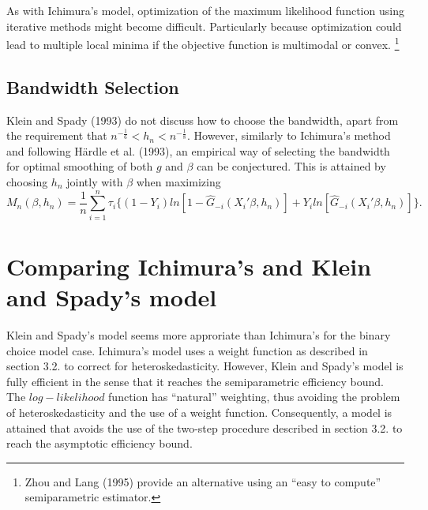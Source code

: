 \documentclass[a4paper]{article}
\begin{document}
As with Ichimura's model, optimization of the maximum likelihood function using iterative methods might become difficult.  Particularly because optimization could lead to multiple local minima if the objective function is multimodal or convex. \footnote{Zhou and Lang (1995) provide an alternative using an ``easy to compute'' semiparametric estimator.}

\subsection{Bandwidth Selection} %
\label{sub:Bandwidth Selection}

Klein and Spady (1993) do not discuss how to choose the bandwidth, apart from the requirement that $ n^{-\frac{1}{6}} < h_n < n^{-\frac{1}{8}}$. However, similarly to Ichimura's method and following H{\"a}rdle et al. (1993), an empirical way of selecting the bandwidth for optimal smoothing of both $g$ and $\beta$ can be conjectured. This is attained by choosing $h_n$ jointly with $\beta$ when maximizing
\begin{equation}
M_n(\beta, h_n) = \frac{1}{n}\sum_{i=1}^n \tau_{i}\{ (1 - Y_i)ln[ 1 - \hat{G}_{-i}(X_i'\beta, h_n)] +  Y_iln[\hat{G}_{-i}(X_i'\beta, h_n)]\}.
\end{equation}


\section{Comparing Ichimura's and Klein and Spady's model} %
\label{sec:Comparing Ichimura's and Klein and Spady's model}

Klein and Spady's model seems more approriate than Ichimura's for the binary choice model case. Ichimura's model uses a weight function as described in section 3.2. to correct for heteroskedasticity. However, Klein and Spady's model is fully efficient in the sense that it reaches the semiparametric efficiency bound.  The $log-likelihood$ function has ``natural'' weighting, thus avoiding the problem of heteroskedasticity and the use of a weight function.  Consequently, a model is attained that avoids the use of the two-step procedure described in section 3.2. to reach the asymptotic efficiency bound. 

\newpage 


\end{document}
